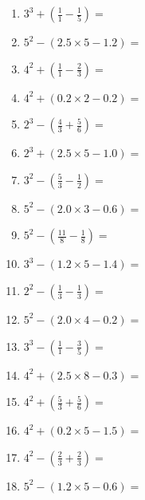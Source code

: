 \documentclass[12pt]{article}
\begin{document}
\begin{enumerate}
\item \large $ 3^{3} + (\frac{1}{1} - \frac{1}{5}) = $ \vspace{1.6cm}
\item \large $ 5^{2} - (2.5 \times 5 - 1.2) = $ \vspace{1.6cm}
\item \large $ 4^{2} + (\frac{1}{1} - \frac{2}{3}) = $ \vspace{1.6cm}
\item \large $ 4^{2} + (0.2 \times 2 - 0.2) = $ \vspace{1.6cm}
\newpage
\item \large $ 2^{3} - (\frac{4}{3} + \frac{5}{6}) = $ \vspace{1.6cm}
\item \large $ 2^{3} + (2.5 \times 5 - 1.0) = $ \vspace{1.6cm}
\item \large $ 3^{2} - (\frac{5}{3} - \frac{1}{2}) = $ \vspace{1.6cm}
\item \large $ 5^{2} - (2.0 \times 3 - 0.6) = $ \vspace{1.6cm}
\item \large $ 5^{2} - (\frac{11}{8} - \frac{1}{8}) = $ \vspace{1.6cm}
\item \large $ 3^{3} - (1.2 \times 5 - 1.4) = $ \vspace{1.6cm}
\item \large $ 2^{2} - (\frac{1}{3} - \frac{1}{3}) = $ \vspace{1.6cm}
\item \large $ 5^{2} - (2.0 \times 4 - 0.2) = $ \vspace{1.6cm}
\item \large $ 3^{3} - (\frac{1}{1} - \frac{3}{5}) = $ \vspace{1.6cm}
\item \large $ 4^{2} + (2.5 \times 8 - 0.3) = $ \vspace{1.6cm}
\newpage
\item \large $ 4^{2} + (\frac{5}{3} + \frac{5}{6}) = $ \vspace{1.6cm}
\item \large $ 4^{2} + (0.2 \times 5 - 1.5) = $ \vspace{1.6cm}
\item \large $ 4^{2} - (\frac{2}{3} + \frac{2}{3}) = $ \vspace{1.6cm}
\item \large $ 5^{2} - (1.2 \times 5 - 0.6) = $ \vspace{1.6cm}

\end{enumerate}
\end{document}
